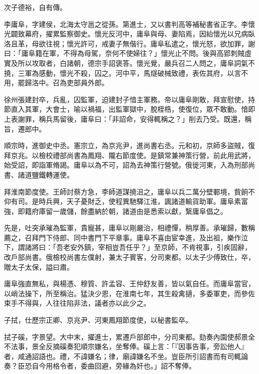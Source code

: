\begin{pinyinscope}
 次子德裕，自有傳。



 李庸阜，字建侯，北海太守邕之從孫。第進士，又以書判高等補秘書省正字。李懷光闢致幕府，擢累監察御史。懷光反河中，庸阜與母、妻陷焉，因紿懷光以兄病臥洛且革，母欲往視；懷光許可，戒妻子無偕行。庸阜私遣之，懷光怒，欲加罪，謝曰：「庸阜籍在軍，不得為母駕，奈何不使婦往？」懷光止不問。後與高郢刺賊虛實及所以攻取者，白諸朝，德宗手詔褒答。懷光覺，嚴兵召二人問之，庸阜詞氣不撓，三軍為感動，懷光不殺，囚之。河中平，馬燧破械致禮，表佐其府，以言不用，罷歸洛中。召為吏部員外郎。



 徐州張建封卒，兵亂，囚監軍，迫建封子愔主軍務。帝以庸阜剛敢，拜宣慰使，持節直入其軍，大會士，喻以禍福，出監軍獄中，脫桎梏，使復位，眾不敢動。愔即上表謝罪，稱兵馬留後，庸阜曰：「非詔命，安得輒稱之？」削去乃受。既還，稱旨，遷郎中。



 順宗時，進御史中丞。憲宗立，為京兆尹，進尚書右丞。元和初，京師多盜賊，復拜京兆。以檢校禮部尚書為鳳翔、隴右節度使。是鎮常兼神策行營，前此用武將，始受詔，即詣軍脩謁。庸阜以為不可，詔為去神策行營號。俄徙河東，入為刑部尚書、諸道鹽鐵轉運使。



 拜淮南節度使。王師討蔡方急，李師道謀撓沮之，庸阜以兵二萬分壁鄆境，貲餉不仰有司。是時兵興，天子憂財乏，使程異馳驛江淮，諷諸道輸貨助軍。庸阜素富強，即籍府庫留一歲儲，餘盡納於朝，諸道由是悉索以獻，繄庸阜倡之。



 先是，吐突承璀為監軍，貴寵甚，庸阜以剛嚴治，相禮憚，稍厚善。承璀歸，數稱薦之，召拜門下侍郎、同中書門下平章事。庸阜不喜由宦幸進，及出祖，樂作泣下，謂諸將曰：「吾老安外鎮，宰相豈吾任乎？」至京師，不肯視事，引疾固辭，改戶部尚書。俄檢校尚書左僕射，兼太子賓客，分司東都。以太子少傅致仕，卒，贈太子太保，謚曰肅。



 庸阜強直無私，與楊憑、穆質、許孟容、王仲舒友善，皆以氣自任。而庸阜當官，以峭法操下，所至稱治。猛決少恩，在淮南七年，其生殺禽擿，多委軍吏，而參佐束手不得與，人往往陷非法，議者亦以此少之。



 子拭，仕歷宗正卿、京兆尹、河東鳳翔節度使，以秘書監卒。



 拭子磎，字景望。大中末，擢進士，累遷戶部郎中，分司東都。劾奏內園使郝景全不法事，景全反摘磎奏犯順宗嫌名，坐奪俸。磎上言：「『因事告事，旁訟他人』者，咸通詔語也。禮，不諱嫌名；律，廟諱嫌名不坐。豈臣所引詔書而有司輒論奏？臣恐自今用格令者，委曲回避，旁緣為奸也。」詔不奪俸。




\end{pinyinscope}
